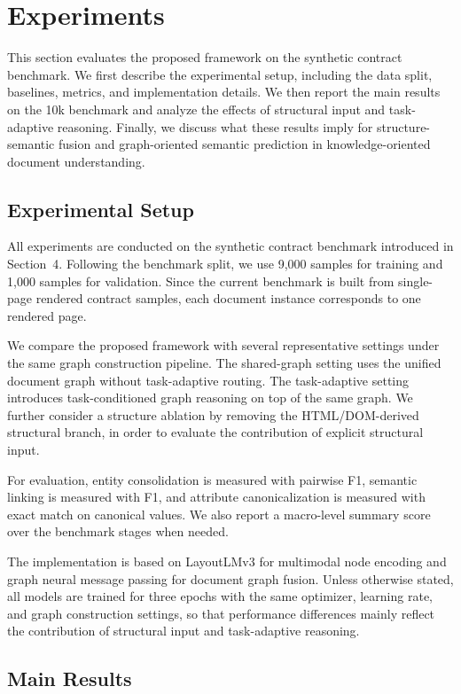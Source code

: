 \documentclass[pdflatex,twocolumn,iicol,sn-vancouver-num]{sn-jnl}%
\theoremstyle{thmstyleone}%
\theoremstyle{thmstyletwo}%
\theoremstyle{thmstylethree}%
\begin{document}
\section{Experiments}

This section evaluates the proposed framework on the synthetic contract benchmark. We first describe the experimental setup, including the data split, baselines, metrics, and implementation details. We then report the main results on the 10k benchmark and analyze the effects of structural input and task-adaptive reasoning. Finally, we discuss what these results imply for structure-semantic fusion and graph-oriented semantic prediction in knowledge-oriented document understanding.

\subsection{Experimental Setup}

All experiments are conducted on the synthetic contract benchmark introduced in Section~4. Following the benchmark split, we use 9,000 samples for training and 1,000 samples for validation. Since the current benchmark is built from single-page rendered contract samples, each document instance corresponds to one rendered page.

We compare the proposed framework with several representative settings under the same graph construction pipeline. The shared-graph setting uses the unified document graph without task-adaptive routing. The task-adaptive setting introduces task-conditioned graph reasoning on top of the same graph. We further consider a structure ablation by removing the HTML/DOM-derived structural branch, in order to evaluate the contribution of explicit structural input.

For evaluation, entity consolidation is measured with pairwise F1, semantic linking is measured with F1, and attribute canonicalization is measured with exact match on canonical values. We also report a macro-level summary score over the benchmark stages when needed.

The implementation is based on LayoutLMv3 for multimodal node encoding and graph neural message passing for document graph fusion. Unless otherwise stated, all models are trained for three epochs with the same optimizer, learning rate, and graph construction settings, so that performance differences mainly reflect the contribution of structural input and task-adaptive reasoning.
\subsection{Main Results}
\end{document}
